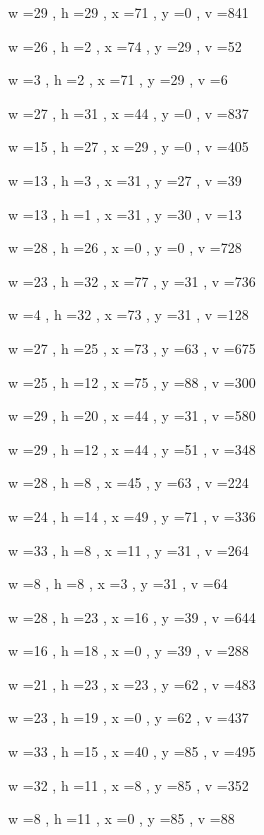\documentclass[11pt]{article}
\begin{document}
w =29 , h =29 , x =71 , y =0 , v =841
\par
w =26 , h =2 , x =74 , y =29 , v =52
\par
w =3 , h =2 , x =71 , y =29 , v =6
\par
w =27 , h =31 , x =44 , y =0 , v =837
\par
w =15 , h =27 , x =29 , y =0 , v =405
\par
w =13 , h =3 , x =31 , y =27 , v =39
\par
w =13 , h =1 , x =31 , y =30 , v =13
\par
w =28 , h =26 , x =0 , y =0 , v =728
\par
w =23 , h =32 , x =77 , y =31 , v =736
\par
w =4 , h =32 , x =73 , y =31 , v =128
\par
w =27 , h =25 , x =73 , y =63 , v =675
\par
w =25 , h =12 , x =75 , y =88 , v =300
\par
w =29 , h =20 , x =44 , y =31 , v =580
\par
w =29 , h =12 , x =44 , y =51 , v =348
\par
w =28 , h =8 , x =45 , y =63 , v =224
\par
w =24 , h =14 , x =49 , y =71 , v =336
\par
w =33 , h =8 , x =11 , y =31 , v =264
\par
w =8 , h =8 , x =3 , y =31 , v =64
\par
w =28 , h =23 , x =16 , y =39 , v =644
\par
w =16 , h =18 , x =0 , y =39 , v =288
\par
w =21 , h =23 , x =23 , y =62 , v =483
\par
w =23 , h =19 , x =0 , y =62 , v =437
\par
w =33 , h =15 , x =40 , y =85 , v =495
\par
w =32 , h =11 , x =8 , y =85 , v =352
\par
w =8 , h =11 , x =0 , y =85 , v =88
\par
\newpage
\end{document}
